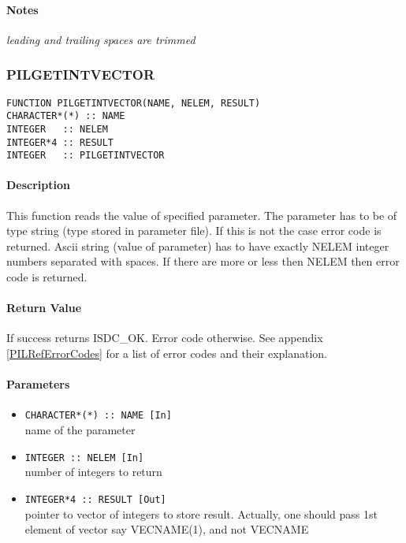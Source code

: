 \paragraph{Notes\\}
{\it
leading and trailing spaces are trimmed
}



\subsubsection{PILGETINTVECTOR}

\begin{verbatim}
FUNCTION PILGETINTVECTOR(NAME, NELEM, RESULT) 
CHARACTER*(*) :: NAME 
INTEGER   :: NELEM
INTEGER*4 :: RESULT 
INTEGER   :: PILGETINTVECTOR
\end{verbatim}

\paragraph{Description\\}
This function reads the value of specified parameter. The parameter has
to be of type string (type stored in parameter file). If this is not the
case error code is returned. Ascii string (value of parameter) has to have
exactly NELEM integer numbers separated with spaces. If there are more
or less then NELEM then error code is returned.

\paragraph{Return Value\\}
If success returns ISDC\_OK. Error code otherwise. See appendix \ref{PILRefErrorCodes}
for a list of error codes and their explanation.

\paragraph{Parameters}
\begin{itemize}
\item
{\tt CHARACTER*(*) :: NAME [In] } \\
name of the parameter 
\item
{\tt INTEGER   :: NELEM [In] } \\
number of integers to return
\item
{\tt INTEGER*4 :: RESULT [Out] } \\
pointer to vector of integers to store result. Actually, one should
pass 1st element of vector say VECNAME(1), and not VECNAME
\end{itemize}


